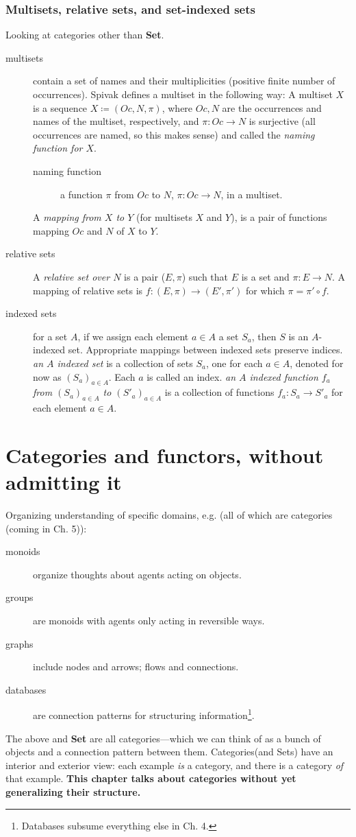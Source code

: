 \documentclass{article}
\begin{document}
\subsubsection{Multisets, relative sets, and set-indexed sets}
Looking at categories other than \textbf{Set}.
\begin{description}
\item[multisets]contain a set of names and their multiplicities (positive finite number of occurrences). Spivak defines a multiset in the following way:
A multiset $X$ is a sequence $X \coloneqq (Oc, N, \pi)$, where $Oc, N$ are the occurrences and names of the multiset, respectively, and $\pi: Oc \rightarrow N$ is surjective (all occurrences are named, so this makes sense) and called the \emph{naming function for $X$}.
\begin{description}
\item[naming function] a function $\pi$ from $Oc$ to $N$, $\pi: Oc \rightarrow N$, in a multiset.
\end{description}
A \emph{mapping from $X$ to $Y$} (for multisets $X$ and $Y$), is a pair of functions mapping $Oc$ and $N$ of $X$ to $Y$.
\item[relative sets] A \emph{relative set over $N$} is a pair ($E,\pi$)
such that $E$ is a set and $\pi: E\rightarrow N$. A mapping of relative sets is $f: (E,\pi)\rightarrow (E', \pi')$ for which $\pi = \pi' \circ f$.
\item[indexed sets] for a set $A$, if we assign each element $a \in A$ a set $S_a$, then $S$ is an $A$-indexed set. Appropriate mappings between indexed sets preserve indices.
\emph{an $A$ indexed set} is a collection of sets $S_a$, one for each $a \in A$, denoted for now as $(S_a)_{a \in A}$. Each $a$ is called an index.
\emph{an $A$ indexed function $f_a$ from $(S_a)_{a \in A}$ to $(S'_a)_{a \in A}$} is a collection of functions $f_a: S_a \rightarrow S'_a$ for each element $a \in A$.
\end{description}

\section{Categories and functors, without admitting it}
Organizing understanding of specific domains, e.g. (all of which are categories (coming in Ch. 5)):
\begin{description}
\item[monoids] organize thoughts about agents acting on objects.
\item[groups] are monoids with agents only acting in reversible ways.
\item[graphs] include nodes and arrows; flows and connections.
\item[databases] are connection patterns for structuring information\footnote{Databases subsume everything else in Ch. 4.}.
\end{description}
The above and \textbf{Set} are all categories---which we can think of as a bunch of objects and a connection pattern between them.
Categories(and Sets) have an interior and exterior view: each example \emph{is} a category, and there is a category \emph{of} that example.
\textbf{This chapter talks about categories without yet generalizing their structure.}
\end{document}
